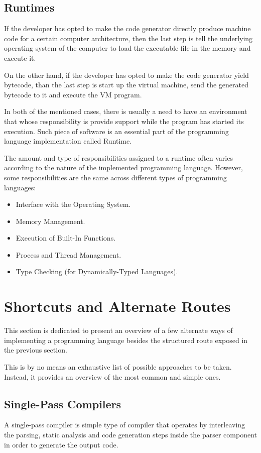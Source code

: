 \subsection{Runtimes}
If the developer has opted to make the code generator directly produce machine code for a certain computer architecture, then the last step is tell the underlying operating system of the computer to load the executable file in the memory and execute it.

On the other hand, if the developer has opted to make the code generator yield bytecode, than the last step is start up the virtual machine, send the generated bytecode to it and execute the VM program.

In both of the mentioned cases, there is usually a need to have an environment that whose responsibility is provide support while the program has started its execution. Such piece of software is an essential part of the programming language implementation called Runtime.

The amount and type of responsibilities assigned to a runtime often varies according to the nature of the implemented programming language. However, some responsibilities are the same across different types of 
programming languages:

\begin{itemize}
    \item Interface with the Operating System.
    \item Memory Management.
    \item Execution of Built-In Functions.
    \item Process and Thread Management.
    \item Type Checking (for Dynamically-Typed Languages).
\end{itemize}


\section{Shortcuts and Alternate Routes}
This section is dedicated to present an overview of a few alternate ways of implementing a programming language besides the structured route exposed in the previous section. 

This is by no means an exhaustive list of possible approaches to be taken. Instead, it provides an overview of the most common and simple ones.

\subsection{Single-Pass Compilers}
A single-pass compiler is simple type of compiler that operates by interleaving the parsing, static analysis and code generation steps inside the parser component in order to generate the output code.


